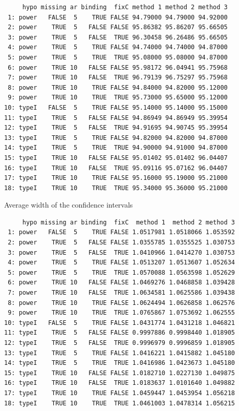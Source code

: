 \documentclass[12pt]{article}
\begin{document}
\begin{verbatim}
     hypo missing ar binding  fixC method 1 method 2 method 3
 1: power   FALSE  5    TRUE FALSE 94.79000 94.79000 94.92000
 2: power    TRUE  5   FALSE FALSE 95.86382 95.86207 95.66505
 3: power    TRUE  5   FALSE  TRUE 96.30458 96.26486 95.66505
 4: power    TRUE  5    TRUE FALSE 94.74000 94.74000 94.87000
 5: power    TRUE  5    TRUE  TRUE 95.08000 95.08000 94.87000
 6: power    TRUE 10   FALSE FALSE 95.98172 96.04941 95.75968
 7: power    TRUE 10   FALSE  TRUE 96.79139 96.75297 95.75968
 8: power    TRUE 10    TRUE FALSE 94.84000 94.82000 95.12000
 9: power    TRUE 10    TRUE  TRUE 95.73000 95.65000 95.12000
10: typeI   FALSE  5    TRUE FALSE 95.14000 95.14000 95.15000
11: typeI    TRUE  5   FALSE FALSE 94.86949 94.86949 95.39954
12: typeI    TRUE  5   FALSE  TRUE 94.91695 94.90745 95.39954
13: typeI    TRUE  5    TRUE FALSE 94.82000 94.82000 94.87000
14: typeI    TRUE  5    TRUE  TRUE 94.90000 94.91000 94.87000
15: typeI    TRUE 10   FALSE FALSE 95.01402 95.01402 96.04407
16: typeI    TRUE 10   FALSE  TRUE 95.09116 95.07162 96.04407
17: typeI    TRUE 10    TRUE FALSE 95.16000 95.19000 95.21000
18: typeI    TRUE 10    TRUE  TRUE 95.34000 95.36000 95.21000
\end{verbatim}

Average width of the confidence intervals
\begin{verbatim}
     hypo missing ar binding  fixC  method 1  method 2 method 3
 1: power   FALSE  5    TRUE FALSE 1.0517981 1.0518066 1.053592
 2: power    TRUE  5   FALSE FALSE 1.0355785 1.0355525 1.030753
 3: power    TRUE  5   FALSE  TRUE 1.0410966 1.0414270 1.030753
 4: power    TRUE  5    TRUE FALSE 1.0513207 1.0513607 1.052634
 5: power    TRUE  5    TRUE  TRUE 1.0570088 1.0563598 1.052629
 6: power    TRUE 10   FALSE FALSE 1.0469276 1.0468858 1.039428
 7: power    TRUE 10   FALSE  TRUE 1.0634581 1.0625586 1.039438
 8: power    TRUE 10    TRUE FALSE 1.0624494 1.0626858 1.062576
 9: power    TRUE 10    TRUE  TRUE 1.0765867 1.0753692 1.062555
10: typeI   FALSE  5    TRUE FALSE 1.0431774 1.0431218 1.046821
11: typeI    TRUE  5   FALSE FALSE 0.9997886 0.9998440 1.018905
12: typeI    TRUE  5   FALSE  TRUE 0.9996979 0.9996859 1.018905
13: typeI    TRUE  5    TRUE FALSE 1.0416221 1.0415882 1.045180
14: typeI    TRUE  5    TRUE  TRUE 1.0416986 1.0423673 1.045180
15: typeI    TRUE 10   FALSE FALSE 1.0182710 1.0227130 1.049875
16: typeI    TRUE 10   FALSE  TRUE 1.0183637 1.0101640 1.049882
17: typeI    TRUE 10    TRUE FALSE 1.0459447 1.0453954 1.056218
18: typeI    TRUE 10    TRUE  TRUE 1.0461003 1.0478314 1.056215
\end{verbatim}
\end{document}
